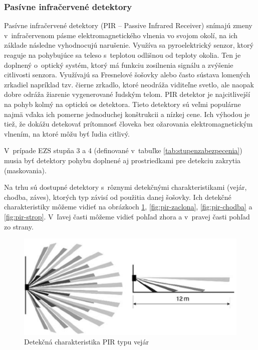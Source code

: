 \subsubsection{Pasívne infračervené detektory}\label{sec:pir}

Pasívne infračervené detektory (PIR – Passive Infrared Receiver) snímajú zmeny v~infračervenom pásme elektromagnetického vlnenia vo svojom okolí, na ich základe následne vyhodnocujú narušenie. Využíva sa pyroelektrický senzor, ktorý reaguje na pohybujúce sa teleso s~teplotou odlišnou od teploty okolia. Ten je doplnený o~optický systém, ktorý má funkciu zosilnenia signálu a zvýšenie citlivosti senzora. Využívajú sa Fresnelové šošovky alebo často sústava lomených zrkadiel napríklad tzv. čierne zrkadlo, ktoré neodráža viditeľne svetlo, ale naopak dobre odráža žiarenie vygenerované ľudským telom. PIR detektor je najcitlivejší na pohyb kolmý na optickú os detektora. Tieto detektory sú veľmi populárne najmä vďaka ich pomerne jednoduchej konštrukcii a nízkej cene. Ich výhodou je tiež, že dokážu detekovať prítomnosť človeka bez ožarovania elektromagnetickým vlnením, na ktoré môžu byť ľudia citlivý.\cite{velas_ezs}

V~prípade EZS stupňa 3 a 4 (definované v~tabuľke \ref{tab:stupenzabezpecenia}) musia byť detektory pohybu doplnené aj prostriedkami pre detekciu zakrytia (maskovania).\cite{csn-en-50131-1}

Na trhu sú dostupné detektory s~rôznymi detekčnými charakteristikami (vejár, chodba, záves),
ktorých typ závisí od použitia danej šošovky. Ich detekčné charakteristiky môžeme vidieť na obrázkoch \ref{fig:pir-vejar}, \ref{fig:pir-zaclona}, \ref{fig:pir-chodba} a \ref{fig:pir-strop}. V~ľavej časti môžeme vidieť pohľad zhora a v~pravej časti pohľad zo strany.

\begin{figure}[!ht]
    \centering
    \includegraphics[width=0.75\linewidth]{obrazky-figures/PIR-vejar.png}
    \caption[Detekčná charakteristika PIR typu vejár]{Detekčná charakteristika PIR typu vejár\cite{PIR-vejar}}
    \label{fig:pir-vejar}
\end{figure}

